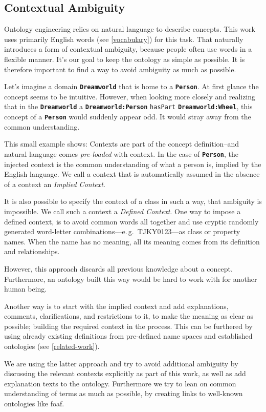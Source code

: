 \documentclass[a4paper, DIV=13, BCOR=0cm]{scrbook}
\newcommand{\eg}{e.\,g.\ }
\newcommand{\class}[1]{\texttt{\textbf{#1}}}
\newcommand{\relation}[1]{\texttt{#1}}
\begin{document}
\subsection{Contextual Ambiguity}
Ontology engineering relies on natural language to describe concepts. This work uses primarily English words (see \autoref{vocabulary}) for this task. That naturally introduces a form of contextual ambiguity, because people often use words in a flexible manner. \cite[p.\,7, 1.5.2]{uschold1998enterprise}  It's our goal to keep the ontology as simple as possible. It is therefore important to find a way to avoid ambiguity as much as possible.

Let's imagine a domain \class{Dreamworld} that is home to a \class{Person}. At first glance the concept seems to be intuitive. However, when looking more closely and realizing that in the \class{Dreamworld} a \class{Dreamworld:Person} \relation{hasPart} \class{Dreamworld:Wheel}, this concept of a \class{Person} would suddenly appear odd. It would stray away from the common understanding.

This small example shows: Contexts are part of the concept definition--and natural language comes \textit{pre-loaded} with context. In the case of \class{Person}, the injected context is the common understanding of what a person is, implied by the English language. We call a context that is automatically assumed in the absence of a context an \textit{Implied Context}.

It is also possible to specify the context of a class in such a way, that ambiguity is impossible. We call such a context a \textit{Defined Context}. One way to impose a defined context, is to avoid common words all together and use cryptic randomly generated word-letter combinations---\eg TJKY0123---as class or property names. When the name has no meaning, all its meaning comes from its definition and relationships.

However, this approach discards all previous knowledge about a concept. Furthermore, an ontology built this way would be hard to work with for another human being.

Another way is to start with the implied context and add explanations, comments, clarifications, and restrictions to it, to make the meaning as clear as possible; building the required context in the process. This can be furthered by using already existing definitions from pre-defined name spaces and established ontologies (see \autoref{related-work}).

We are using the latter approach and try to avoid additional ambiguity by discussing the relevant contexts explicitly as part of this work, as well as add explanation texts to the ontology. Furthermore we try to lean on common understanding of terms as much as possible, by creating links to well-known ontologies like \gls{foaf}.
\end{document}

